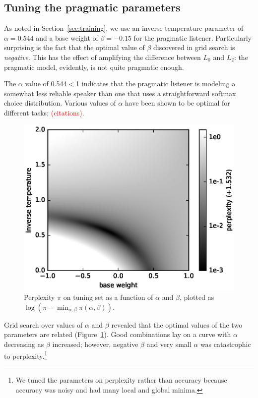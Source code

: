 \documentclass[11pt,letterpaper]{article}
\newcommand{\Listener}{L}
\renewcommand{\|}{\mid}
\newcommand{\secref}[1]{Section~\ref{#1}}
\newcommand{\figref}[1]{Figure~\ref{#1}}
\newcommand{\todocheck}[1]{\textcolor{red}{#1}}
\begin{document}
\subsection{Tuning the pragmatic parameters} \label{sec:alpha_beta}

As noted in \secref{sec:training}, we use an inverse temperature parameter of
$\alpha = 0.544$ and a base weight of $\beta = -0.15$ for the pragmatic
listener. Particularly surprising is the fact that the optimal value of $\beta$
discovered in grid search is \emph{negative}. This has the effect of amplifying
the difference between $\Listener_0$ and $\Listener_2$: the pragmatic model,
evidently, is not quite pragmatic enough.

The $\alpha$ value of 0.544${}<{}$1 indicates that the pragmatic listener is
modeling a somewhat less reliable speaker than one that uses a straightforward
softmax choice distribution. Various values of $\alpha$ have been shown to
be optimal for different tasks; \todocheck{(citations)}.

\begin{figure}
\centering
\includegraphics[width=\columnwidth]{figures/alpha_beta.eps}
\caption{Perplexity $\pi$ on tuning set as a function of $\alpha$ and $\beta$, plotted as $\log(\pi - \min_{\alpha,\beta} \pi(\alpha, \beta))$.}
\label{fig:alpha_beta}
\end{figure}

Grid search over values of $\alpha$ and $\beta$ revealed that the optimal values of 
the two parameters are related (\figref{fig:alpha_beta}). Good combinations lay on
a curve with $\alpha$ decreasing as $\beta$ increased; however, negative $\beta$ and
very small $\alpha$ was catastrophic to perplexity.\footnote{We tuned the
parameters on perplexity rather than accuracy because accuracy was noisy and had
many local and global minima.}
\end{document}
